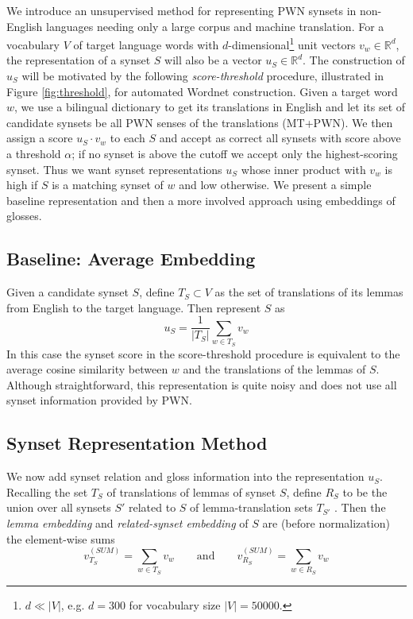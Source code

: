 \documentclass{book}
\begin{document}
We introduce an unsupervised method for representing PWN synsets in non-English languages needing only a large corpus and machine translation.
For a vocabulary $V$ of target language words with $d$-dimensional\footnote{$d\ll|V|$, e.g. $d=300$ for vocabulary size $|V|=50000$.} unit vectors $v_w\in\mathbb{R}^d$, the representation of a synset $S$ will also be a vector $u_S\in\mathbb{R}^d$.
The construction of $u_S$ will be motivated by the following {\em score-threshold} procedure, illustrated in Figure \ref{fig:threshold}, for automated Wordnet construction.
Given a target word $w$, we use a bilingual dictionary to get its translations in English and let its set of candidate synsets be all PWN senses of the translations (MT+PWN).
We then assign a score $u_S\cdot v_w$ to each $S$ and accept as correct all synsets with score above a threshold $\alpha$;
if no synset is above the cutoff we accept only the highest-scoring synset.
Thus we want synset representations $u_S$ whose inner product with $v_w$ is high if $S$ is a matching synset of $w$ and low otherwise.
We present a simple baseline representation and then a more involved approach using embeddings of glosses.

\subsection{Baseline: Average Embedding}
\label{subsec:baseline}

Given a candidate synset $S$, define $T_S\subset V$ as the set of translations of its lemmas from English to the target language.
Then represent $S$ as
$$u_S=\frac{1}{|T_S|}\sum_{w\in T_S}v_w$$
In this case the synset score in the score-threshold procedure is equivalent to the average cosine similarity between $w$ and the translations of the lemmas of $S$.
Although straightforward, this representation is quite noisy and does not use all synset information provided by PWN.

\subsection{Synset Representation Method}
\label{subsec:synsetrep}

We now add synset relation and gloss information into the representation $u_S$.
Recalling the set $T_S$ of translations of lemmas of synset $S$, define $R_S$ to be the union over all synsets $S'$ related to $S$ of lemma-translation sets $T_{S'}$ .
Then the {\em lemma embedding} and {\em related-synset embedding} of $S$ are (before normalization) the element-wise sums 
$$v_{T_S}^{(SUM)}=\sum\limits_{w\in T_S}v_w\qquad\textrm{and}\qquad v_{R_S}^{(SUM)}=\sum\limits_{w\in R_S}v_w$$
\end{document}
